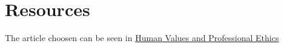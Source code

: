 \documentclass[12pt, a4papre]{article}
\begin{document}
	\section{Resources}
	
	The article choosen can be seen in \href{https://eng.rizvi.edu.in/wp-content/uploads/2020/04/Handbook-Human-Values-and-Professional-Ethics.pdf}{Human Values and Professional Ethics}
\end{document}
